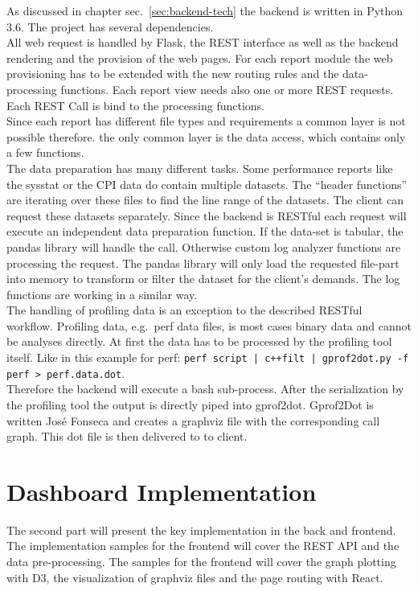 \documentclass[american,a4paper,oneside,,tablecaptionabove]{scrbook}
\begin{document}
As discussed in chapter sec.~\ref{sec:backend-tech} the backend is
written in Python 3.6. The project has several dependencies.\\
All web request is handled by Flask, the REST interface as well as the
backend rendering and the provision of the web pages. For each report
module the web provisioning has to be extended with the new routing
rules and the data-processing functions. Each report view needs also one
or more REST requests. Each REST Call is bind to the processing
functions.\\
Since each report has different file types and requirements a common
layer is not possible therefore. the only common layer is the data
access, which contains only a few functions.\\
The data preparation has many different tasks. Some performance reports
like the sysstat or the CPI data do contain multiple datasets. The
\enquote{header functions} are iterating over these files to find the
line range of the datasets. The client can request these datasets
separately. Since the backend is RESTful each request will execute an
independent data preparation function. If the data-set is tabular, the
pandas library will handle the call. Otherwise custom log analyzer
functions are processing the request. The pandas library will only load
the requested file-part into memory to transform or filter the dataset
for the client's demands. The log functions are working in a similar
way.\\
The handling of profiling data is an exception to the described RESTful
workflow. Profiling data, e.g.~perf data files, is most cases binary
data and cannot be analyses directly. At first the data has to be
processed by the profiling tool itself. Like in this example for perf:
\lstinline!perf script | c++filt | gprof2dot.py -f perf > perf.data.dot!.\\
Therefore the backend will execute a bash sub-process. After the
serialization by the profiling tool the output is directly piped into
gprof2dot. Gprof2Dot is written José Fonseca and creates a graphviz file
with the corresponding call graph. This dot file is then delivered to to
client.

\section{Dashboard Implementation}\label{dashboard-implementation}

The second part will present the key implementation in the back and
frontend. The implementation samples for the frontend will cover the
REST API and the data pre-processing. The samples for the frontend will
cover the graph plotting with D3, the visualization of graphviz files
and the page routing with React.\\
\end{document}
